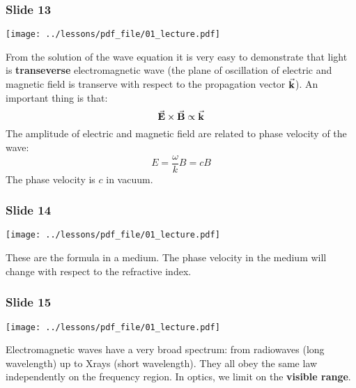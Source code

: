 \documentclass[../main/main.tex]{subfiles}
\begin{document}
\subsubsection*{Slide 13}

\begin{minipage}[]{0.5\linewidth}
\centering
\texttt{[image: ../lessons/pdf\_file/01\_lecture.pdf]}
\end{minipage}
\hspace{0.3cm}\vspace{0.3cm}
\begin{minipage}[c]{0.47\linewidth}
From the solution of the wave equation it is very easy to demonstrate that light is \textbf{transeverse} electromagnetic wave (the plane of oscillation of electric and magnetic field is transerve with respect to the propagation vector \( \va{k} \)).
An important thing is that:
\begin{equation*}
  \va{E} \times \va{B} \propto \va{k}
\end{equation*}
The amplitude of electric and magnetic field are related to phase velocity of the wave:
\begin{equation*}
  E = \frac{\omega }{k} B = c B
\end{equation*}
The phase velocity is \( c \) in vacuum.
\end{minipage}

\subsubsection*{Slide 14}

\begin{minipage}[]{0.5\linewidth}
\centering
\texttt{[image: ../lessons/pdf\_file/01\_lecture.pdf]}
\end{minipage}
\hspace{0.3cm}\vspace{0.3cm}
\begin{minipage}[c]{0.47\linewidth}
These are the formula in a medium. The phase velocity in the medium will change with respect to the refractive index.
\end{minipage}

\subsubsection*{Slide 15}

\begin{minipage}[]{0.5\linewidth}
\centering
\texttt{[image: ../lessons/pdf\_file/01\_lecture.pdf]}
\end{minipage}
\hspace{0.3cm}\vspace{0.3cm}
\begin{minipage}[c]{0.47\linewidth}
Electromagnetic waves have a very broad spectrum: from radiowaves (long wavelength) up to Xrays (short wavelength). They all obey the same law independently on the frequency region. In optics, we limit on the \textbf{visible range}.
\end{minipage}
\end{document}
